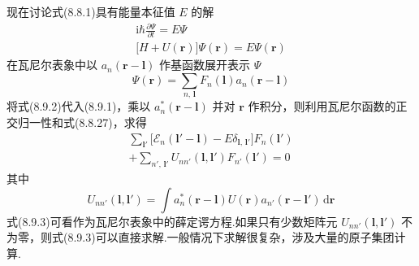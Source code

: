 现在讨论式(8.8.1)具有能量本征值 $E$ 的解
\begin{equation}
\begin{gathered}
  \mathrm{i}\hbar\frac{\partial\Psi}{\partial t}=E\Psi\\[0.2em]
  \bigl[H+U(\boldsymbol{r})\bigr]\Psi(\boldsymbol{r})=E\Psi(\boldsymbol{r})
\end{gathered}
\end{equation}
在瓦尼尔表象中以 $a_{n}(\boldsymbol{r}-\boldsymbol{l})$ 作基函数展开表示 $\Psi$
\begin{equation}
  \Psi(\boldsymbol{r})=\sum_{n,\,\boldsymbol{l}}F_{n}(\boldsymbol{l})a_{n}(\boldsymbol{r}-\boldsymbol{l})
\end{equation}
将式(8.9.2)代入(8.9.1)，乘以 $a_{n}^{*}(\boldsymbol{r}-\boldsymbol{l})$ 并对 $\boldsymbol{r}$ 作积分，则利用瓦尼尔函数的正交归一性和式(8.8.27)，求得
\begin{equation}
\begin{aligned}
  \sum_{\boldsymbol{l}'}\bigl[\mathscr{E}_{n}(\boldsymbol{l}'-\boldsymbol{l})-E\delta_{\boldsymbol{l},\,\boldsymbol{l}'}\bigr]F_{n}(\boldsymbol{l}')\\
  +\sum_{n',\,\boldsymbol{l}'}U_{nn'}(\boldsymbol{l},\boldsymbol{l}')F_{n'}(\boldsymbol{l}')=0
\end{aligned}
\end{equation}
其中
\begin{equation}
  U_{nn'}(\boldsymbol{l},\boldsymbol{l}')
  =\int a_{n}^{*}(\boldsymbol{r}-\boldsymbol{l})U(\boldsymbol{r})a_{n'}(\boldsymbol{r}-\boldsymbol{l}')\,\mathrm{d}\boldsymbol{r}
\end{equation}
式(8.9.3)可看作为瓦尼尔表象中的薛定谔方程.如果只有少数矩阵元 $U_{nn'}(\boldsymbol{l},\boldsymbol{l}')$ 不为零，则式(8.9.3)可以直接求解.一般情况下求解很复杂，涉及大量的原子集团计算.

